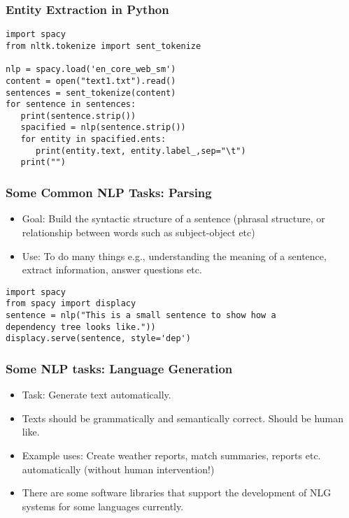 \documentclass{beamer}
\begin{document}
\begin{frame}[fragile]
\frametitle{Entity Extraction in Python}
\small
\begin{verbatim}
import spacy
from nltk.tokenize import sent_tokenize

nlp = spacy.load('en_core_web_sm')
content = open("text1.txt").read()
sentences = sent_tokenize(content)
for sentence in sentences:
   print(sentence.strip())
   spacified = nlp(sentence.strip())
   for entity in spacified.ents:
      print(entity.text, entity.label_,sep="\t")
   print("")
\end{verbatim}
\end{frame}

\begin{frame}[fragile]
\frametitle{Some Common NLP Tasks: Parsing}
\begin{itemize}
\item Goal: Build the syntactic structure of a sentence (phrasal structure, or relationship between words such as subject-object etc)
\item Use: To do many things e.g., understanding the meaning of a sentence, extract information, answer questions etc.
\end{itemize} \small
\begin{verbatim}
import spacy
from spacy import displacy
sentence = nlp("This is a small sentence to show how a 
dependency tree looks like."))
displacy.serve(sentence, style='dep')
\end{verbatim}
\end{frame}

\begin{frame}
\frametitle{Some NLP tasks: Language Generation}
\begin{itemize}
\item Task: Generate text automatically.
\item Texts should be grammatically and semantically correct. Should be human like.
\item Example uses: Create weather reports, match summaries, reports etc. automatically (without human intervention!)
\item There are some software libraries that support the development of NLG systems for some languages currently.
\end{itemize}
\end{frame}
\end{document}
